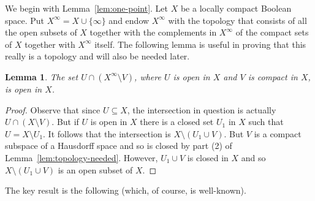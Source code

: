 \documentclass[a4paper]{amsart}
\newtheorem{lemma}[theorem]{Lemma}
\begin{document}
We begin with Lemma~\ref{lem:one-point}.
Let $X$ be a locally compact Boolean space.
Put $X^{\infty} = X \cup \{\infty\}$ and endow $X^{\infty}$ with
the topology that consists of all the open subsets of $X$ together with the complements in $X^{\infty}$ of
the compact sets of $X$ together with $X^{\infty}$ itself.
The following lemma is useful in proving that this really is a topology and will also be needed later.

\begin{lemma}\label{lem:one-point-topology}
The set $U \cap (X^{\infty} \setminus V)$, where $U$ is open in $X$ and $V$ is compact in $X$, is open in $X$.
\end{lemma}
\begin{proof} Observe that since $U \subseteq X$, the intersection in question is actually $U \cap (X \setminus V)$.
But if $U$ is open in $X$ there is a closed set $U_{1}$ in $X$ such that $U = X \setminus U_{1}$.
It follows that the intersection is $X \setminus (U_{1} \cup V)$.
But $V$ is a compact subspace of a Hausdorff space and so is closed by part (2) of Lemma~\ref{lem:topology-needed}.
However, $U_{1} \cup V$ is closed in $X$ and so $X \setminus (U_{1} \cup V)$ is an open subset of $X$.
\end{proof}

The key result is the following (which, of course, is well-known).
\end{document}

